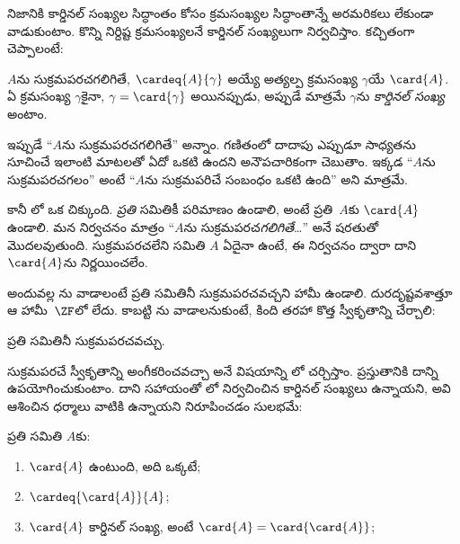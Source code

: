 \documentclass[../../../include/open-logic-section]{subfiles}
\begin{document}

నిజానికి కార్డినల్ సంఖ్యల సిద్ధాంతం కోసం క్రమసంఖ్యల
సిద్ధాంతాన్నే అరమరికలు లేకుండా వాడుకుంటాం. కొన్ని నిర్దిష్ట
క్రమసంఖ్యలనే కార్డినల్ సంఖ్యలుగా నిర్వచిస్తాం. కచ్చితంగా చెప్పాలంటే:

\begin{defn}
$A$ను సుక్రమపరచగలిగితే, $\cardeq{A}{\gamma}$ అయ్యే అత్యల్ప క్రమసంఖ్య $\gamma$యే $\card{A}$. ఏ క్రమసంఖ్య $\gamma$కైనా, $\gamma = \card{\gamma}$ అయినప్పుడు, అప్పుడే మాత్రమే $\gamma$ను \emph{కార్డినల్ సంఖ్య} అంటాం.
\end{defn}

ఇప్పుడే ``$A$ను సుక్రమపరచగలిగితే'' అన్నాం. గణితంలో
దాదాపు ఎప్పుడూ సాధ్యతను సూచించే ఇలాంటి మాటలతో ఏదో ఒకటి
ఉందని అనౌపచారికంగా చెబుతాం. ఇక్కడ ``$A$ను సుక్రమపరచగలం''
అంటే ``$A$ను సుక్రమపరిచే సంబంధం ఒకటి ఉంది'' అని మాత్రమే.

కానీ లో ఒక చిక్కుంది.
\emph{ప్రతి} సమితికీ పరిమాణం ఉండాలి, అంటే ప్రతి~$A$కు
$\card{A}$ ఉండాలి. మన నిర్వచనం మాత్రం
``$A$ను సుక్రమపరచ\emph{గలిగితే}\ldots'' అనే షరతుతో
మొదలవుతుంది. సుక్రమపరచలేని సమితి $A$ ఏదైనా ఉంటే,
ఈ నిర్వచనం ద్వారా దాని $\card{A}$ను నిర్ణయించలేం.

అందువల్ల ను వాడాలంటే ప్రతి సమితినీ సుక్రమపరచవచ్చని హామీ ఉండాలి. దురదృష్టవశాత్తూ ఆ హామీ~$\ZF$లో లేదు. కాబట్టి ను వాడాలనుకుంటే, కింది తరహా కొత్త స్వీకృతాన్ని చేర్చాలి:
\begin{axiom}[సుక్రమపరచడం]
ప్రతి సమితినీ సుక్రమపరచవచ్చు.
\end{axiom}
సుక్రమపరచే స్వీకృతాన్ని అంగీకరించవచ్చా అనే విషయాన్ని లో చర్చిస్తాం. ప్రస్తుతానికి దాన్ని ఉపయోగించుకుంటాం. దాని సహాయంతో లో నిర్వచించిన కార్డినల్ సంఖ్యలు ఉన్నాయని, అవి ఆశించిన ధర్మాలు వాటికి ఉన్నాయని నిరూపించడం సులభమే:

\begin{lem}
ప్రతి సమితి $A$కు:
\begin{enumerate}
	\item{} $\card{A}$ ఉంటుంది, అది ఒక్కటే;
	\item{}  $\cardeq{\card{A}}{A}$;
	\item{}  $\card{A}$ కార్డినల్ సంఖ్య, అంటే $\card{A} = \card{\card{A}}$;
\end{enumerate}
\end{lem}
\end{document}
